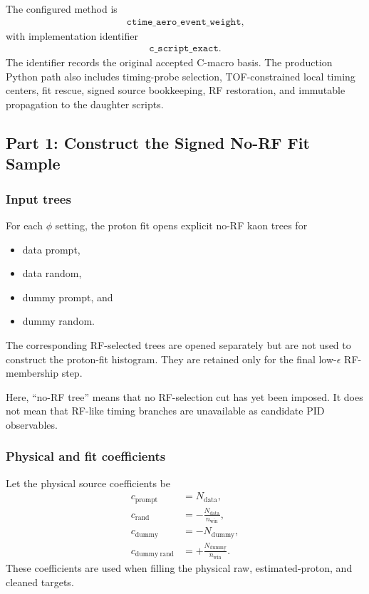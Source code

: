 \documentclass[11pt]{article}
\begin{document}
The configured method is
\begin{align}
  \texttt{ctime\_aero\_event\_weight},
\end{align}
with implementation identifier
\begin{align}
  \texttt{c\_script\_exact}.
\end{align}
The identifier records the original accepted C-macro basis.  The production
Python path also includes timing-probe selection, TOF-constrained local timing
centers, fit rescue, signed source bookkeeping, RF restoration, and immutable
propagation to the daughter scripts.

\subsection{Part 1: Construct the Signed No-RF Fit Sample}

\subsubsection*{Input trees}

For each $\phi$ setting, the proton fit opens explicit no-RF kaon trees for
\begin{itemize}[leftmargin=2em]
  \item data prompt,
  \item data random,
  \item dummy prompt, and
  \item dummy random.
\end{itemize}
The corresponding RF-selected trees are opened separately but are not used to
construct the proton-fit histogram.  They are retained only for the final
low-$\epsilon$ RF-membership step.

Here, ``no-RF tree'' means that no RF-selection cut has yet been imposed.  It
does not mean that RF-like timing branches are unavailable as candidate PID
observables.

\subsubsection*{Physical and fit coefficients}

Let the physical source coefficients be
\begin{align}
  c_{\mathrm{prompt}} &= N_{\mathrm{data}},\\
  c_{\mathrm{rand}} &= -\frac{N_{\mathrm{data}}}{n_{\mathrm{win}}},\\
  c_{\mathrm{dummy}} &= -N_{\mathrm{dummy}},\\
  c_{\mathrm{dummy\ rand}}
    &= +\frac{N_{\mathrm{dummy}}}{n_{\mathrm{win}}}.
\end{align}
These coefficients are used when filling the physical raw, estimated-proton,
and cleaned targets.
\end{document}
